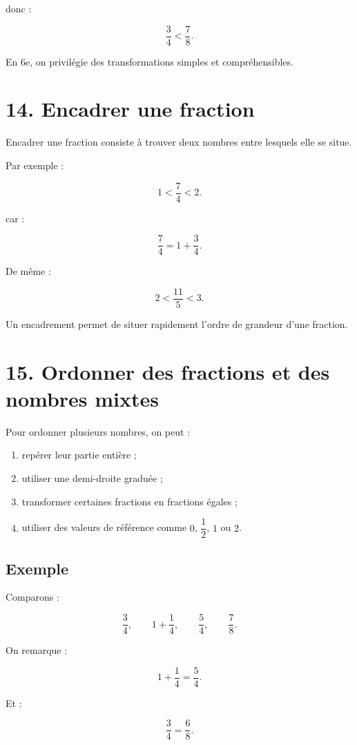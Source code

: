 donc :

\[
\boxed{
\dfrac{3}{4}<\dfrac{7}{8}
}.
\]

En 6e, on privilégie des transformations simples et compréhensibles.

\section{14. Encadrer une fraction}

Encadrer une fraction consiste à trouver deux nombres entre lesquels elle se situe.

Par exemple :

\[
1<\dfrac{7}{4}<2.
\]

car :

\[
\dfrac{7}{4}
=
1+\dfrac{3}{4}.
\]

De même :

\[
2<\dfrac{11}{5}<3.
\]

Un encadrement permet de situer rapidement l’ordre de grandeur d’une fraction.

\section{15. Ordonner des fractions et des nombres mixtes}

Pour ordonner plusieurs nombres, on peut :

\begin{enumerate}
\item repérer leur partie entière ;
\item utiliser une demi-droite graduée ;
\item transformer certaines fractions en fractions égales ;
\item utiliser des valeurs de référence comme $0$, $\dfrac{1}{2}$, $1$ ou $2$.
\end{enumerate}

\subsection{Exemple}

Comparons :

\[
\dfrac{3}{4},
\qquad
1+\dfrac{1}{4},
\qquad
\dfrac{5}{4},
\qquad
\dfrac{7}{8}.
\]

On remarque :

\[
1+\dfrac{1}{4}
=
\dfrac{5}{4}.
\]

Et :

\[
\dfrac{3}{4}
=
\dfrac{6}{8}.
\]

